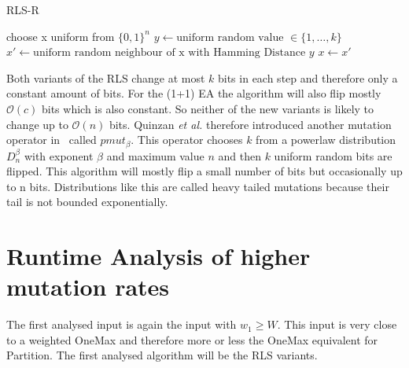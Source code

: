 \begin{algorithm}[bt]
      \caption{\textsc{RLS-R}}\label{alg:rlsR}

      \DontPrintSemicolon %

      \BlankLine
      choose x uniform from ${\{0,1\}}^n$\;
      {
      $y \leftarrow \text{uniform random value }\in \{1,\dots,k\}$\;
      $x' \leftarrow \text{uniform random neighbour of x with Hamming Distance } y$\;
      {
      {
            $x \leftarrow x'$\;
      }
      }
      }
\end{algorithm}

Both variants of the RLS change at most $k$ bits in each step and therefore only a constant amount of bits.
For the (1+1) EA the algorithm will also flip mostly $\mathcal{O}(c)$ bits which is also constant.
So neither of the new variants is likely to change up to $\mathcal{O}(n)$ bits.
Quinzan \textit{et al.} therefore introduced another mutation operator in~\cite{friedrich2018evolutionary} called $pmut_\beta$.
This operator chooses $k$ from a powerlaw distribution $D^\beta_n$ with exponent $\beta$ and maximum value $n$ and then $k$ uniform random bits are flipped.
This algorithm will mostly flip a small number of bits but occasionally up to n bits.
Distributions like this are called heavy tailed mutations because their tail is not bounded exponentially.

\section{Runtime Analysis of higher mutation rates}

The first analysed input is again the input with $w_1\ge W$.
This input is very close to a weighted OneMax and therefore more or less the OneMax equivalent for Partition.
The first analysed algorithm will be the RLS variants.


